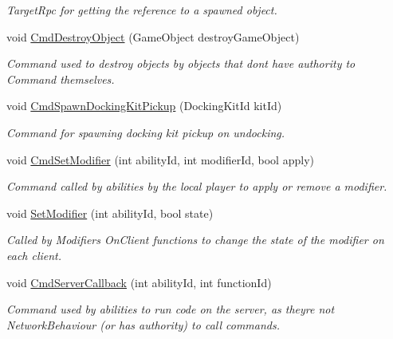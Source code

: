 \begin{DoxyCompactItemize}
\begin{DoxyCompactList}\small\item\em Target\+Rpc for getting the reference to a spawned object. \end{DoxyCompactList}\item 
void \hyperlink{class_docking_ab0ce11f5480cfae24f0ffd9f2735d22e}{Cmd\+Destroy\+Object} (Game\+Object destroy\+Game\+Object)
\begin{DoxyCompactList}\small\item\em Command used to destroy objects by objects that don\textquotesingle{}t have authority to Command themselves. \end{DoxyCompactList}\item 
void \hyperlink{class_docking_a5a98e6a60b7d03ab023bbb21c97f4ff4}{Cmd\+Spawn\+Docking\+Kit\+Pickup} (Docking\+Kit\+Id kit\+Id)
\begin{DoxyCompactList}\small\item\em Command for spawning docking kit pickup on undocking. \end{DoxyCompactList}\item 
void \hyperlink{class_docking_a34f8c9d62c42cb6ab4df7e874e55ca55}{Cmd\+Set\+Modifier} (int ability\+Id, int modifier\+Id, bool apply)
\begin{DoxyCompactList}\small\item\em Command called by abilities by the local player to apply or remove a modifier. \end{DoxyCompactList}\item 
void \hyperlink{class_docking_ad9f7c2688aca9e6b91c6b07082041eb4}{Set\+Modifier} (int ability\+Id, bool state)
\begin{DoxyCompactList}\small\item\em Called by Modifiers On\+Client functions to change the state of the modifier on each client. \end{DoxyCompactList}\item 
void \hyperlink{class_docking_a3c06359cbaa3683d3934674641328776}{Cmd\+Server\+Callback} (int ability\+Id, int function\+Id)
\begin{DoxyCompactList}\small\item\em Command used by abilities to run code on the server, as they\textquotesingle{}re not Network\+Behaviour (or has authority) to call commands. \end{DoxyCompactList}\item 
\hypertarget{class_docking_af6367a4d9b1cfb7153e616e6a6ee45e8}{}\label{class_docking_af6367a4d9b1cfb7153e616e6a6ee45e8} 

\end{DoxyCompactItemize}
